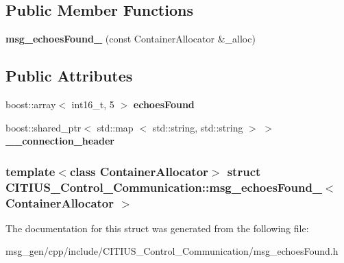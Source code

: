 \subsection*{\-Public \-Member \-Functions}
\begin{DoxyCompactItemize}
\item 
\hypertarget{struct_c_i_t_i_u_s___control___communication_1_1msg__echoes_found___ab136200ec704541bfeb7e41b3b2e2032}{{\bfseries msg\-\_\-echoes\-Found\-\_\-} (const \-Container\-Allocator \&\-\_\-alloc)}\label{struct_c_i_t_i_u_s___control___communication_1_1msg__echoes_found___ab136200ec704541bfeb7e41b3b2e2032}

\end{DoxyCompactItemize}
\subsection*{\-Public \-Attributes}
\begin{DoxyCompactItemize}
\item 
\hypertarget{struct_c_i_t_i_u_s___control___communication_1_1msg__echoes_found___ae2ccd60c5c1c77da1911eaf57641494a}{boost\-::array$<$ int16\-\_\-t, 5 $>$ {\bfseries echoes\-Found}}\label{struct_c_i_t_i_u_s___control___communication_1_1msg__echoes_found___ae2ccd60c5c1c77da1911eaf57641494a}

\item 
\hypertarget{struct_c_i_t_i_u_s___control___communication_1_1msg__echoes_found___a34a525140a57bf106e6eac4ebafd82bd}{boost\-::shared\-\_\-ptr$<$ std\-::map\*
$<$ std\-::string, std\-::string $>$ $>$ {\bfseries \-\_\-\-\_\-connection\-\_\-header}}\label{struct_c_i_t_i_u_s___control___communication_1_1msg__echoes_found___a34a525140a57bf106e6eac4ebafd82bd}

\end{DoxyCompactItemize}
\subsubsection*{template$<$class Container\-Allocator$>$ struct C\-I\-T\-I\-U\-S\-\_\-\-Control\-\_\-\-Communication\-::msg\-\_\-echoes\-Found\-\_\-$<$ Container\-Allocator $>$}



\-The documentation for this struct was generated from the following file\-:\begin{DoxyCompactItemize}
\item 
msg\-\_\-gen/cpp/include/\-C\-I\-T\-I\-U\-S\-\_\-\-Control\-\_\-\-Communication/msg\-\_\-echoes\-Found.\-h\end{DoxyCompactItemize}
